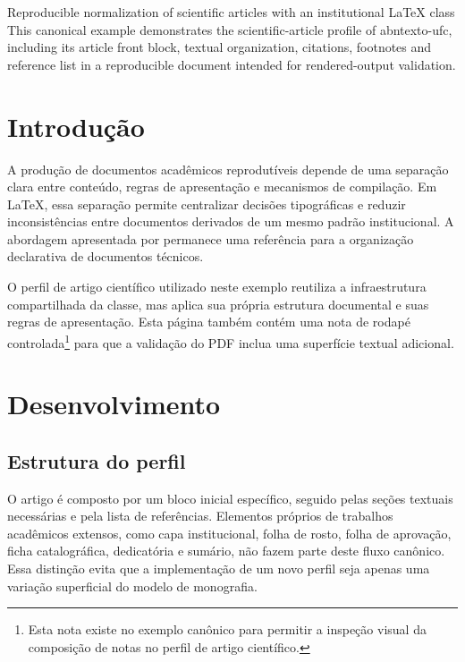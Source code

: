 \documentclass{abntexto-ufc}
\begin{document}

\ufcPrintArticleForeignElements
  {Reproducible normalization of scientific articles with an institutional LaTeX class}
  {This canonical example demonstrates the scientific-article profile of abntexto-ufc, including its article front block, textual organization, citations, footnotes and reference list in a reproducible document intended for rendered-output validation.}

\section{Introdução}

A produção de documentos acadêmicos reprodutíveis depende de uma separação clara entre conteúdo, regras de apresentação e mecanismos de compilação. Em LaTeX, essa separação permite centralizar decisões tipográficas e reduzir inconsistências entre documentos derivados de um mesmo padrão institucional. A abordagem apresentada por \textcite{lamport1994} permanece uma referência para a organização declarativa de documentos técnicos.

O perfil de artigo científico utilizado neste exemplo reutiliza a infraestrutura compartilhada da classe, mas aplica sua própria estrutura documental e suas regras de apresentação. Esta página também contém uma nota de rodapé controlada\footnote{Esta nota existe no exemplo canônico para permitir a inspeção visual da composição de notas no perfil de artigo científico.} para que a validação do PDF inclua uma superfície textual adicional.

\section{Desenvolvimento}

\subsection{Estrutura do perfil}

O artigo é composto por um bloco inicial específico, seguido pelas seções textuais necessárias e pela lista de referências. Elementos próprios de trabalhos acadêmicos extensos, como capa institucional, folha de rosto, folha de aprovação, ficha catalográfica, dedicatória e sumário, não fazem parte deste fluxo canônico. Essa distinção evita que a implementação de um novo perfil seja apenas uma variação superficial do modelo de monografia.
\end{document}
